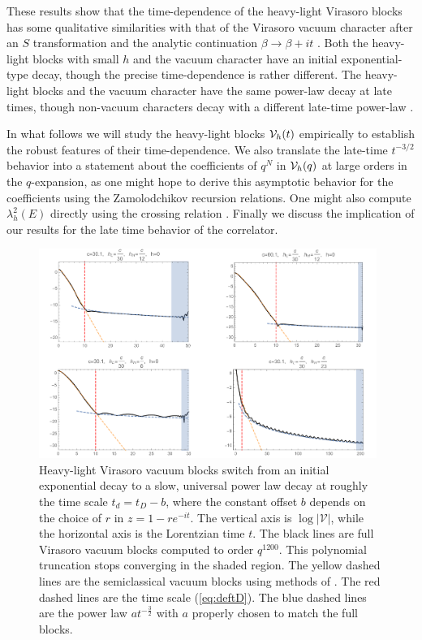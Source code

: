 \documentclass[12pt]{article}
\numberwithin{equation}{section}
\newcommand{\CV}{{\cal V}}
\begin{document}
These results show that the time-dependence of the heavy-light Virasoro blocks has some qualitative similarities with that of the Virasoro vacuum character after an $S$ transformation and the analytic continuation $\beta \to \beta + i t$ \cite{Dyer:2016pou}.  Both the heavy-light blocks with small $h$ and the vacuum character have an initial exponential-type decay, though the precise time-dependence is rather different.  The heavy-light blocks and the vacuum character have the same power-law decay at late times, though non-vacuum characters decay with a different late-time power-law \cite{Dyer:2016pou}.

In what follows we will study the heavy-light blocks $\CV_h(t)$ empirically to establish the robust features of their time-dependence.  We also translate the late-time $t^{-3/2}$ behavior into a statement about the coefficients of $q^N$ in $\CV_h(q)$ at large orders in the $q$-expansion, as one might hope to derive this asymptotic behavior for the coefficients using the Zamolodchikov recursion relations.  One might also compute $\lambda_h^2(E)$ directly using the crossing relation \cite{Ponsot:1999uf, Teschner:2003en}. Finally  we discuss the implication of our results for the  late time behavior of the correlator.


\begin{figure}[h]
\begin{centering}
\includegraphics[width=0.98\textwidth]{VBlock}
\caption{Heavy-light Virasoro vacuum blocks switch from an initial exponential decay to a slow, universal power law decay at roughly the time scale $t_d = t_D - b$, where the constant offset $b$ depends on the choice of $r$ in $z = 1 - re^{-it}$. The vertical axis is $\log|\mathcal{V}|$, while the horizontal axis is the Lorentzian time $t$. The black lines are full Virasoro vacuum blocks computed to order $q^{1200}$. This polynomial truncation stops converging in the shaded region. The yellow dashed lines are the semiclassical vacuum blocks using methods of \cite{Fitzpatrick:2016mjq}. The red dashed lines are the time scale (\ref{eq:deftD}). The blue dashed lines are the power law $a t^{-\frac{3}{2}}$ with $a$ properly chosen to match the full blocks.  }
\label{fig:VBlock}
\end{centering}
\end{figure}
\end{document}
